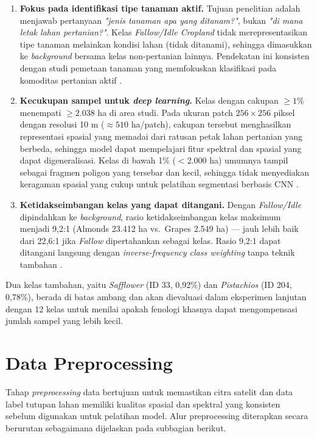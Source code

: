 \begin{enumerate}
    \item \textbf{Fokus pada identifikasi tipe tanaman aktif.}
    Tujuan penelitian adalah menjawab pertanyaan \textit{"jenis tanaman apa yang ditanam?"}, bukan \textit{"di mana letak lahan pertanian?"}.
    Kelas \textit{Fallow/Idle Cropland} tidak merepresentasikan tipe tanaman melainkan kondisi lahan (tidak ditanami), sehingga dimasukkan ke \textit{background} bersama kelas non-pertanian lainnya.
    Pendekatan ini konsisten dengan studi pemetaan tanaman yang memfokuskan klasifikasi pada komoditas pertanian aktif \citep{yi2020, li2023}.

    \item \textbf{Kecukupan sampel untuk \textit{deep learning}.}
    Kelas dengan cakupan $\geq 1\%$ menempati $\geq 2.038$ ha di area studi.
    Pada ukuran patch $256 \times 256$ piksel dengan resolusi 10 m ($\approx 510$ ha/patch), cakupan tersebut menghasilkan representasi spasial yang memadai dari ratusan petak lahan pertanian yang berbeda, sehingga model dapat mempelajari fitur spektral dan spasial yang dapat digeneralisasi.
    Kelas di bawah 1\% ($<$2.000 ha) umumnya tampil sebagai fragmen poligon yang tersebar dan kecil, sehingga tidak menyediakan keragaman spasial yang cukup untuk pelatihan segmentasi berbasis CNN \citep{alamimachichi2023}.

    \item \textbf{Ketidakseimbangan kelas yang dapat ditangani.}
    Dengan \textit{Fallow/Idle} dipindahkan ke \textit{background}, rasio ketidakseimbangan kelas maksimum menjadi 9{,}2:1 (Almonds 23.412 ha vs.\ Grapes 2.549 ha) --- jauh lebih baik dari 22{,}6:1 jika \textit{Fallow} dipertahankan sebagai kelas.
    Rasio 9{,}2:1 dapat ditangani langsung dengan \textit{inverse-frequency class weighting} tanpa teknik tambahan \citep{luo2024}.
\end{enumerate}

Dua kelas tambahan, yaitu \textit{Safflower} (ID 33, 0{,}92\%) dan \textit{Pistachios} (ID 204, 0{,}78\%), berada di batas ambang dan akan dievaluasi dalam eksperimen lanjutan dengan 12 kelas untuk menilai apakah fenologi khasnya dapat mengompensasi jumlah sampel yang lebih kecil.

\section{Data Preprocessing}
Tahap \textit{preprocessing} data bertujuan untuk memastikan citra satelit dan data label tutupan lahan memiliki kualitas spasial dan spektral yang konsisten sebelum digunakan untuk pelatihan model.
Alur preprocessing diterapkan secara berurutan sebagaimana dijelaskan pada subbagian berikut.


